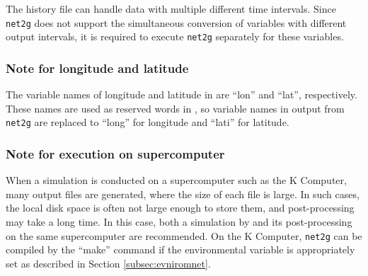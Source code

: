 The history file can handle data with multiple different time intervals.
Since \verb|net2g| does not support the simultaneous conversion of variables with different output intervals,
it is required to execute \verb|net2g| separately for these variables.


\subsubsection{Note for longitude and latitude}
The variable names of longitude and latitude in \scalerm are ``lon'' and ``lat'', respectively.
These names are used as reserved words in \grads,
so variable names in output from \verb|net2g| are replaced to ``long'' for longitude and ``lati'' for latitude.


\subsubsection{Note for execution on supercomputer}
When a simulation is conducted on a supercomputer such as the K Computer, many output files are generated, where the size of each file is large. In such cases, the local disk space is often not large enough to store them,  and post-processing may take a long time. In this case, both a simulation by \scalerm and its post-processing on the same supercomputer are recommended. On the K Computer, \verb|net2g| can be compiled by the ``make'' command  if the environmental variable is appropriately set as described in Section \ref{subsec:evniromnet}.

